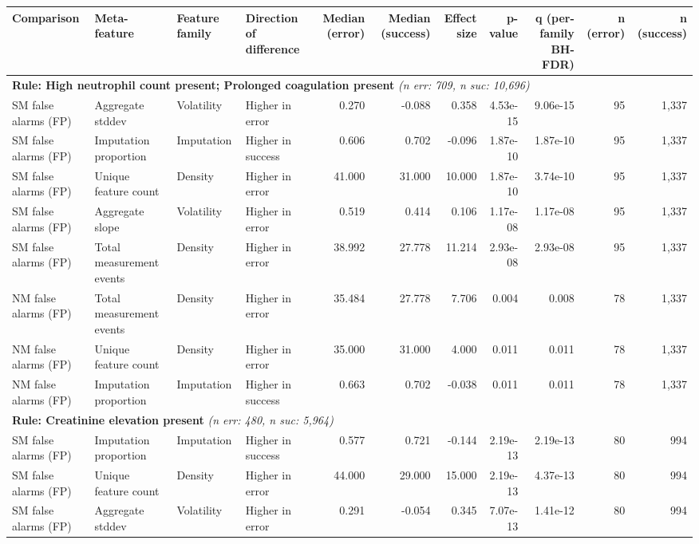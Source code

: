 \documentclass[border=0pt]{standalone}
\begin{document}
\begin{adjustbox}{width=\textwidth}
\begin{tabular}{@{}llllrrrrrrr@{}}
\toprule
Comparison & Meta-feature & Feature family & Direction of difference & Median (error) & Median (success) & Effect size & p-value & q (per-family BH-FDR) & n (error) & n (success) \\
\midrule
\multicolumn{11}{l}{\textbf{Rule: High neutrophil count present; Prolonged coagulation present} \textit{(n err: 709, n suc: 10,696)}} \\
SM false alarms (FP) & Aggregate stddev & Volatility & Higher in error & 0.270 & -0.088 & 0.358 & 4.53e-15 & 9.06e-15 & 95 & 1,337 \\
SM false alarms (FP) & Imputation proportion & Imputation & Higher in success & 0.606 & 0.702 & -0.096 & 1.87e-10 & 1.87e-10 & 95 & 1,337 \\
SM false alarms (FP) & Unique feature count & Density & Higher in error & 41.000 & 31.000 & 10.000 & 1.87e-10 & 3.74e-10 & 95 & 1,337 \\
SM false alarms (FP) & Aggregate slope & Volatility & Higher in error & 0.519 & 0.414 & 0.106 & 1.17e-08 & 1.17e-08 & 95 & 1,337 \\
SM false alarms (FP) & Total measurement events & Density & Higher in error & 38.992 & 27.778 & 11.214 & 2.93e-08 & 2.93e-08 & 95 & 1,337 \\
NM false alarms (FP) & Total measurement events & Density & Higher in error & 35.484 & 27.778 & 7.706 & 0.004 & 0.008 & 78 & 1,337 \\
NM false alarms (FP) & Unique feature count & Density & Higher in error & 35.000 & 31.000 & 4.000 & 0.011 & 0.011 & 78 & 1,337 \\
NM false alarms (FP) & Imputation proportion & Imputation & Higher in success & 0.663 & 0.702 & -0.038 & 0.011 & 0.011 & 78 & 1,337 \\
\multicolumn{11}{l}{\textbf{Rule: Creatinine elevation present} \textit{(n err: 480, n suc: 5,964)}} \\
SM false alarms (FP) & Imputation proportion & Imputation & Higher in success & 0.577 & 0.721 & -0.144 & 2.19e-13 & 2.19e-13 & 80 & 994 \\
SM false alarms (FP) & Unique feature count & Density & Higher in error & 44.000 & 29.000 & 15.000 & 2.19e-13 & 4.37e-13 & 80 & 994 \\
SM false alarms (FP) & Aggregate stddev & Volatility & Higher in error & 0.291 & -0.054 & 0.345 & 7.07e-13 & 1.41e-12 & 80 & 994 \\

\end{tabular}
\end{adjustbox}
\end{document}
